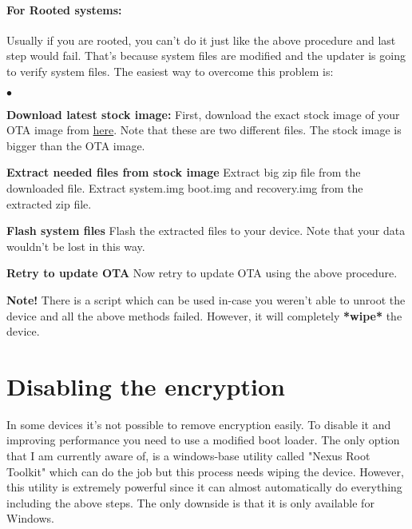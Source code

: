 \paragraph{For Rooted systems:}
Usually if you are rooted, you can't do it just like the above procedure and last step would fail. That's because system files are modified and the updater is going to verify system files. The easiest way to overcome this problem is:
\begin{list}{$\bullet$}{}
	\item{\textbf{Download latest stock image:}}\newline
		First, download the exact stock image of your OTA image from \href{https://developers.google.com/android/nexus/images}{here}. Note that these are two different files. The stock image is bigger than the OTA image.
	\item{\textbf{Extract needed files from stock image}}\newline
		Extract big zip file from the downloaded  file.\newline
		Extract system.img boot.img and recovery.img from the extracted zip file.
	\item{\textbf{Flash system files}}\newline
		Flash the extracted files to your device. Note that your data wouldn't be lost in this way.\newline
		\newline
		\newline
	\item{\textbf{Retry to update OTA}}\newline
		Now retry to update OTA using the above procedure.
\end{list}
\warning \textbf{Note!}
There is a \textbf{} script which can be used in-case you weren't able to unroot the device and all the above methods failed. However, it will completely \textbf{*wipe*} the device.
\section{Disabling the encryption}
In some devices it's not possible to remove encryption easily. To disable it and improving performance you need to use a modified boot loader. The only option that I am currently aware of, is a windows-base utility called "Nexus Root Toolkit" which can do the job but this process needs wiping the device. However, this utility is extremely powerful since it can almost automatically do everything including the above steps. The only downside is that it is only available for Windows. 
